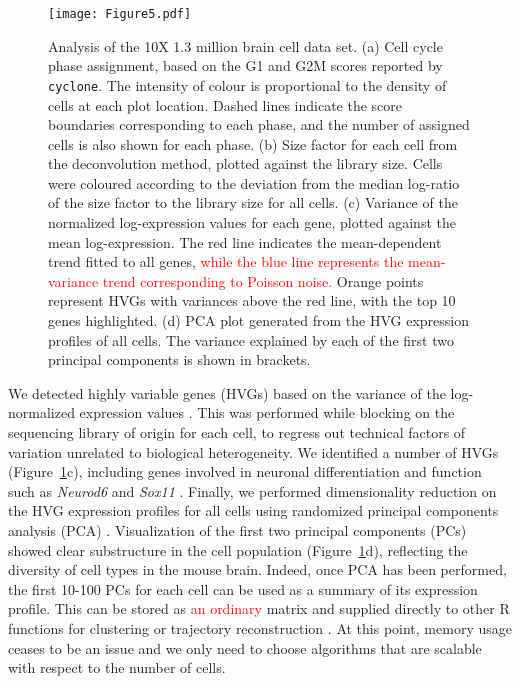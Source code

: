 \documentclass[10pt,letterpaper]{article}
\newcommand{\code}[1]{\texttt{#1}}
\newcommand{\revised}[1]{\textcolor{red}{#1}}
\begin{document}
\begin{figure}
    \begin{center}
        \texttt{[image: Figure5.pdf]}
    \end{center}
    \caption{Analysis of the 10X 1.3 million brain cell data set.
        (a) Cell cycle phase assignment, based on the G1 and G2M scores reported by \code{cyclone}.
        The intensity of colour is proportional to the density of cells at each plot location.
        Dashed lines indicate the score boundaries corresponding to each phase, and the number of assigned cells is also shown for each phase.
        (b) Size factor for each cell from the deconvolution method, plotted against the library size.
        Cells were coloured according to the deviation from the median log-ratio of the size factor to the library size for all cells.
        (c) Variance of the normalized log-expression values for each gene, plotted against the mean log-expression.
        The red line indicates the mean-dependent trend fitted to all genes, \revised{while the blue line represents the mean-variance trend corresponding to Poisson noise.}
        Orange points represent HVGs with variances above the red line, with the top 10 genes highlighted.
        (d) PCA plot generated from the HVG expression profiles of all cells.
        The variance explained by each of the first two principal components is shown in brackets.
    }
    \label{fig:tenx}
\end{figure}

We detected highly variable genes (HVGs) based on the variance of the log-normalized expression values \cite{lun2016stepbystep}.
This was performed while blocking on the sequencing library of origin for each cell, to regress out technical factors of variation unrelated to biological heterogeneity.
We identified a number of HVGs (Figure~\ref{fig:tenx}c), including genes involved in neuronal differentiation and function such as \textit{Neurod6} \cite{ kay2011neurod6} and \textit{Sox11} \cite{bergsland2006establishment}. 
Finally, we performed dimensionality reduction on the HVG expression profiles for all cells using randomized principal components analysis (PCA) \cite{halko2011finding}.
Visualization of the first two principal components (PCs) showed clear substructure in the cell population (Figure~\ref{fig:tenx}d), reflecting the diversity of cell types in the mouse brain.
Indeed, once PCA has been performed, the first 10-100 PCs for each cell can be used as a summary of its expression profile.
This can be stored as \revised{an ordinary} matrix and supplied directly to other R functions for clustering \cite{xu2015identification,csardi2006igraph} or trajectory reconstruction \cite{trapnell2014dynamics}.
At this point, memory usage ceases to be an issue and we only need to choose algorithms that are scalable with respect to the number of cells.
\end{document}
